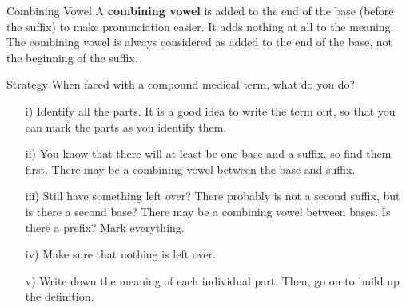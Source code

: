 \begin{defn}{Combining Vowel}
    A \textbf{combining vowel} is added to the end of the base (before the suffix) to make pronunciation easier. It adds nothing at all to the meaning. The combining vowel is always considered as added to the end of the base, not the beginning of the suffix.
\end{defn}

\begin{rmk}{Strategy}
    When faced with a compound medical term, what do you do? \begin{itemize}
        \item[i)] Identify all the parts. It is a good idea to write the term out, so that you can mark the parts as you identify them.
        \item[ii)] You know that there will at least be one base and a suffix, so find them first. There may be a combining vowel between the base and suffix.
        \item[iii)] Still have something left over? There probably is not a second suffix, but is there a second base? There may be a combining vowel between bases. Is there a prefix? Mark everything.
        \item[iv)] Make sure that nothing is left over.
        \item[v)] Write down the meaning of each individual part. Then, go on to build up the definition.
    \end{itemize}
\end{rmk}

